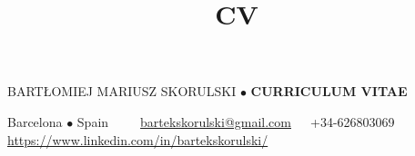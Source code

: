 \documentclass[a4paper, oneside]{scrreprt}
\title{CV}
\author{}
\date{}
\begin{document}
\noindent BARTŁOMIEJ MARIUSZ SKORULSKI $\bullet$ \textbf{CURRICULUM VITAE}

\vspace{-0.3cm}
\noindent\makebox[\linewidth]{\rule{\textwidth}{0.4pt}}


\noindent\llap{\FA \faHome\ \ } Barcelona $\bullet$ Spain\ \
{\FA \faEnvelope\ \ }\ \href{mailto:bartekskorulski@gmail.com}{bartekskorulski@gmail.com}\ \ 
{\FA \faMobilePhone}\  +34-626803069\\
\noindent\llap{\FA \faLinkedin\ \ }
\href{https://www.linkedin.com/in/bartekskorulski/}{https://www.linkedin.com/in/bartekskorulski/}\\
\noindent\llap{\FA \faStickyNote\ \ } 


\end{document}
